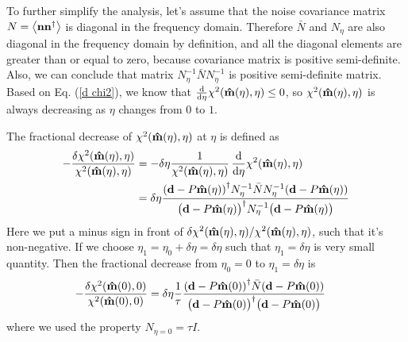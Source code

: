 \documentclass[11pt, letterpaper]{article}
\newcommand{\vbd}{\vb{d}}
\newcommand{\vbn}{\vb{n}}
\newcommand{\inv}[1]{#1^{-1}}
\newcommand{\hatm}{\vb{\hat{m}}}
\newcommand{\Nbar}{\bar{N}}
\newcommand{\Neta}{N_{\eta}}
\begin{document}
To further simplify the analysis, let's assume that the noise covariance matrix
$N = \ev{\vbn\vbn^{\dagger}}$ is diagonal in the frequency domain.
Therefore $\Nbar$ and $\Neta$ are also diagonal in the frequency domain by
definition, and all the diagonal elements are greater than or equal to zero,
because covariance matrix is positive semi-definite.
Also, we can conclude that matrix
$\inv{\Neta} \Nbar \inv{\Neta}$ is positive semi-definite matrix.
Based on Eq. (\ref{d chi2}), we know that
$\dv{\eta} \chi^2({\hatm(\eta), \eta}) \leq 0$,
so $\chi^2(\hatm(\eta), \eta)$ is always decreasing
as $\eta$ changes from $0$ to $1$.

The fractional decrease of $\chi^2(\hatm(\eta), \eta)$ at $\eta$ is defined as
\begin{align}
\begin{aligned}[b]
-\frac{\delta \chi^2(\hatm(\eta),\eta)} {\chi^2(\hatm(\eta), \eta)}
&=
-\delta \eta \frac{1}{\chi^2(\hatm(\eta), \eta)} \, 
\dv{\eta} \chi^2(\hatm(\eta), \eta) 
\\&= 
\delta \eta 
\frac{\qty(\vbd - P\hatm(\eta))^{\dagger}
    \inv{\Neta} \Nbar \inv{\Neta}
    (\vbd - P\hatm(\eta)) 
}
{\qty\big(\vbd - P \hatm(\eta))^{\dagger} 
    \inv{\Neta}
    \qty\big(\vbd - P\hatm(\eta))
}
\end{aligned}
\end{align}
Here we put a minus sign in front of
$\delta\chi^2(\hatm(\eta), \eta)/\chi^2(\hatm(\eta), \eta)$,
such that it's non-negative.
If we choose $\eta_1 = \eta_0 + \delta\eta = \delta\eta$
such that $\eta_1 = \delta \eta$ is very small quantity.
Then the fractional decrease from $\eta_0= 0$ to $\eta_1 = \delta \eta$ is
\begin{align}
\begin{aligned}[b]
-\frac{\delta \chi^2(\hatm(0), 0)}{\chi^2(\hatm(0), 0)} 
&= \delta \eta 
\frac{1}{\tau}
\frac{\qty(\vbd - P\hatm(0))^{\dagger} \Nbar  (\vbd - P\hatm(0)) }
    {\qty\big(\vbd - P \hatm(0))^{\dagger} \qty\big(\vbd - P\hatm(0))}
\label{chi2 fractional decrease}
\end{aligned}
\end{align}
where we used the property $N_{\eta=0} = \tau I$.
\end{document}
